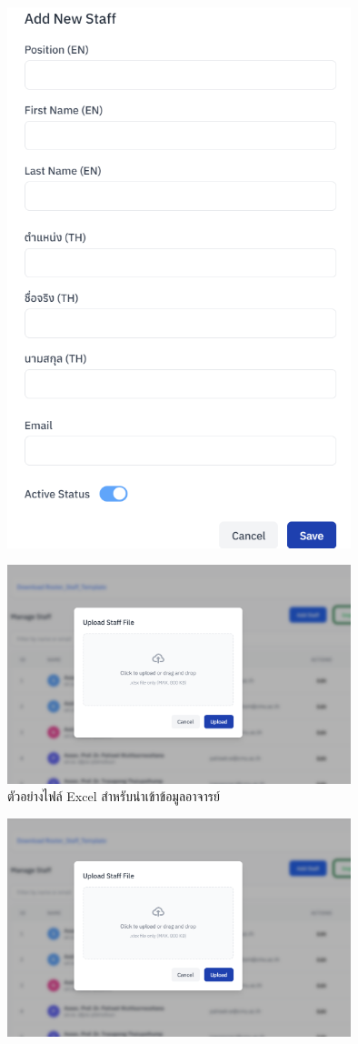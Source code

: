 \begin{itemize}
\begin{enumerate}
\begin{figure}[H]
        \includegraphics[width=100mm, keepaspectratio ]{pictures/project_box/add_staff.png}
    \end{figure}
    \begin{figure}[H]
        \centering
        \includegraphics[width=100mm, keepaspectratio ]{pictures/project_box/add_staff_excel.png}
        \caption{ตัวอย่างไฟล์ Excel สำหรับนำเข้าข้อมูลอาจารย์}
    \end{figure}
    \begin{figure}
        \centering
        \includegraphics[width=100mm, keepaspectratio ]{pictures/project_box/add_staff_excel.png}

\end{figure}
\end{enumerate}
\end{itemize}
